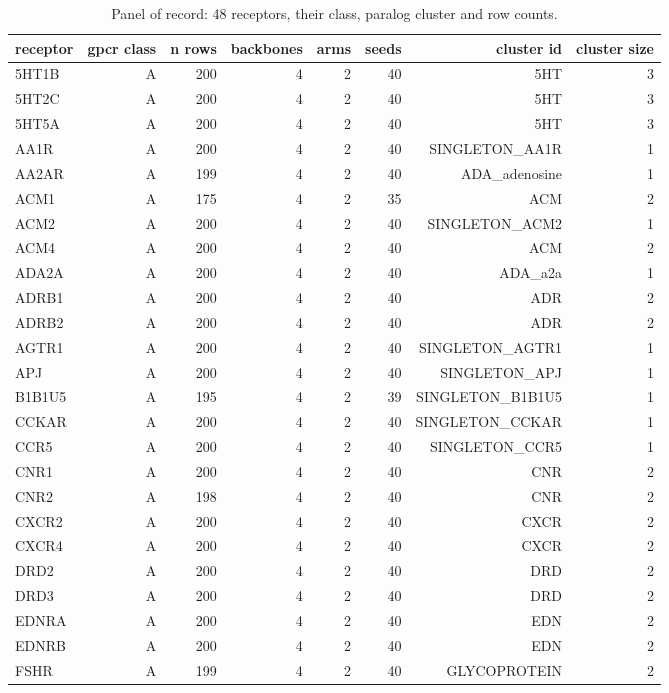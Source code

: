 \begin{table}[htbp]
\centering
\footnotesize
\caption{Panel of record: 48 receptors, their class, paralog cluster and row counts.}
\label{tab:t1_panel_composition}
\begin{tabular}{lrrrrrrr}
\toprule
receptor & gpcr class & n rows & backbones & arms & seeds & cluster id & cluster size \\
\midrule
5HT1B & A & 200 & 4 & 2 & 40 & 5HT & 3 \\
5HT2C & A & 200 & 4 & 2 & 40 & 5HT & 3 \\
5HT5A & A & 200 & 4 & 2 & 40 & 5HT & 3 \\
AA1R & A & 200 & 4 & 2 & 40 & SINGLETON\_AA1R & 1 \\
AA2AR & A & 199 & 4 & 2 & 40 & ADA\_adenosine & 1 \\
ACM1 & A & 175 & 4 & 2 & 35 & ACM & 2 \\
ACM2 & A & 200 & 4 & 2 & 40 & SINGLETON\_ACM2 & 1 \\
ACM4 & A & 200 & 4 & 2 & 40 & ACM & 2 \\
ADA2A & A & 200 & 4 & 2 & 40 & ADA\_a2a & 1 \\
ADRB1 & A & 200 & 4 & 2 & 40 & ADR & 2 \\
ADRB2 & A & 200 & 4 & 2 & 40 & ADR & 2 \\
AGTR1 & A & 200 & 4 & 2 & 40 & SINGLETON\_AGTR1 & 1 \\
APJ & A & 200 & 4 & 2 & 40 & SINGLETON\_APJ & 1 \\
B1B1U5 & A & 195 & 4 & 2 & 39 & SINGLETON\_B1B1U5 & 1 \\
CCKAR & A & 200 & 4 & 2 & 40 & SINGLETON\_CCKAR & 1 \\
CCR5 & A & 200 & 4 & 2 & 40 & SINGLETON\_CCR5 & 1 \\
CNR1 & A & 200 & 4 & 2 & 40 & CNR & 2 \\
CNR2 & A & 198 & 4 & 2 & 40 & CNR & 2 \\
CXCR2 & A & 200 & 4 & 2 & 40 & CXCR & 2 \\
CXCR4 & A & 200 & 4 & 2 & 40 & CXCR & 2 \\
DRD2 & A & 200 & 4 & 2 & 40 & DRD & 2 \\
DRD3 & A & 200 & 4 & 2 & 40 & DRD & 2 \\
EDNRA & A & 200 & 4 & 2 & 40 & EDN & 2 \\
EDNRB & A & 200 & 4 & 2 & 40 & EDN & 2 \\
FSHR & A & 199 & 4 & 2 & 40 & GLYCOPROTEIN & 2 \\

\end{tabular}
\end{table}

